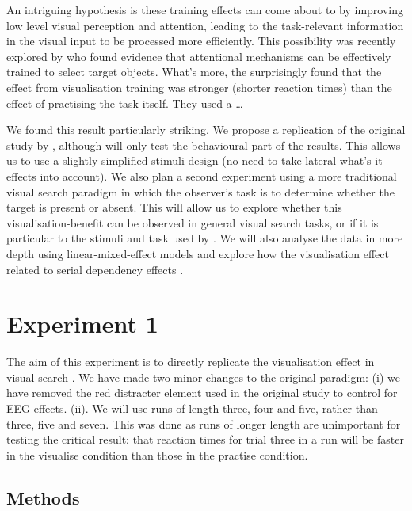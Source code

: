 \documentclass[smallextended]{svjour3}       %
\begin{document}
An intriguing hypothesis is these training effects can come about to by improving low level visual perception and attention, leading to the task-relevant information in the visual input to be processed more efficiently. This possibility was recently explored by \cite{reinhart2015} who found evidence that attentional mechanisms can be effectively trained to select target objects. What's more, the surprisingly found that the effect from visualisation training was stronger (shorter reaction times) than the effect of practising the task itself. They used a \ldots

We found this result particularly striking. We propose a replication of the original study by \cite{reinhart2015}, although will only test the behavioural part of the results. This allows us to use a slightly simplified stimuli design (no need to take lateral what's it effects into account). We also plan a second experiment using a more traditional visual search paradigm in which the observer's task is to determine whether the target is present or absent. This will allow us to explore whether this visualisation-benefit can be observed in general visual search tasks, or if it is particular to the stimuli and task used by \cite{reinhart2015}. We will also analyse the data in more depth using linear-mixed-effect models and explore how the visualisation effect related to serial dependency effects \citep{fischer-whitney2014}.


\section{Experiment 1}
\label{sec:exp1}

The aim of this experiment is to directly replicate the visualisation effect in visual search \citep{reinhart2015}. We have made two minor changes to the original paradigm: (i) we have removed the red distracter element used in the original study to control for EEG effects. (ii). We will use runs of length three, four and five, rather than three, five and seven. This was done as runs of longer length are unimportant for testing the critical result: that reaction times for trial three in a run will be faster in the visualise condition than those in the practise condition. 

\subsection{Methods}
\end{document}
